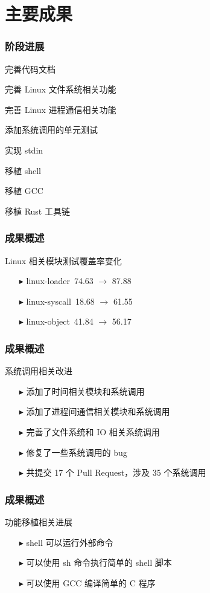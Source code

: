 \documentclass{beamer}
\newcommand{\cmark}{\ding{51}}
\newcommand{\done}{\rlap{$\square$}{\raisebox{2pt}{\large\hspace{1pt}\cmark}}\hspace{-1.5pt}}
\newcommand{\tri}{$\blacktriangleright$}
\begin{document}
\section{主要成果}
\begin{frame}
	\frametitle{阶段进展}
	\begin{itemize}
	\end{itemize}
\end{frame}

\begin{frame}
	\frametitle{成果概述}
	Linux 相关模块测试覆盖率变化
	\begin{itemize}
		\item [\tri] linux-loader\ 74.63 $\rightarrow$ 87.88
		\item [\tri] linux-syscall\ 18.68 $\rightarrow$ 61.55
		\item [\tri] linux-object\ 41.84 $\rightarrow$ 56.17
	\end{itemize}
\end{frame}

\begin{frame}
	\frametitle{成果概述}
	系统调用相关改进
	\begin{itemize}
		\item [\tri] 添加了时间相关模块和系统调用
		\item [\tri] 添加了进程间通信相关模块和系统调用
		\item [\tri] 完善了文件系统和 IO 相关系统调用
		\item [\tri] 修复了一些系统调用的 bug
		\item [\tri] 共提交 17 个 Pull Request，涉及 35 个系统调用
	\end{itemize}
\end{frame}

\begin{frame}
	\frametitle{成果概述}
	功能移植相关进展
	\begin{itemize}
		\item [\tri] shell 可以运行外部命令
		\item [\tri] 可以使用 sh 命令执行简单的 shell 脚本
		\item [\tri] 可以使用 GCC 编译简单的 C 程序
	\end{itemize}
\end{frame}
\end{document}
